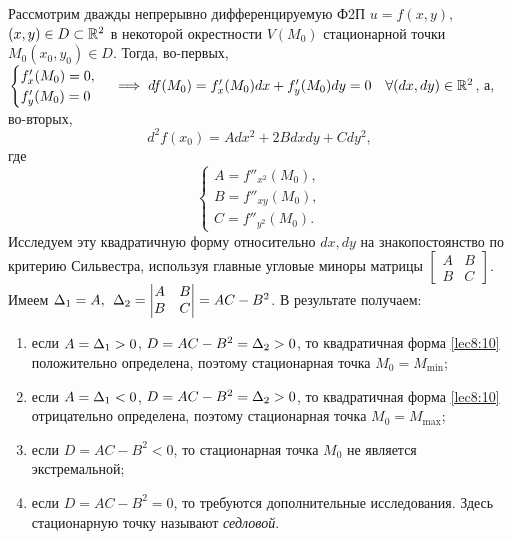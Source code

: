 \documentclass[../../main.tex]{subfiles}
\begin{document}
    \begin{iex}
        Рассмотрим дважды непрерывно дифференцируемую Ф2П $u = f(x, y), \;$
        $(x, y) \in D \subset \mathbb{R}^2$ в некоторой окрестности $V(M_0)$
        стационарной точки $M_0 (x_0, y_0) \in D$. Тогда, во-первых,
        $\begin{cases}
            f'_x(M_0) = 0, \\
            f'_y(M_0) = 0
        \end{cases}
        \implies df(M_0) = f'_x(M_0)dx + f'_y(M_0)dy = 0 
        \quad \forall(dx, dy)
        \in \mathbb{R}^2$, а, во-вторых,
        \begin{equation}
            d^2f(x_0) = Adx^2 + 2Bdxdy + Cdy^2,
            \label{lec8:10}
        \end{equation}
        где
        \[\begin{cases}
            A = f''_{x^2}(M_0), \\
            B = f''_{xy}(M_0), \\
            C = f''_{y^2}(M_0).
        \end{cases}\]
        Исследуем эту квадратичную форму относительно $dx, dy$ на
        знакопостоянство по критерию Сильвестра, используя главные угловые
        миноры матрицы
        $\begin{bmatrix}
            A & B \\
            B & C
        \end{bmatrix}$.
        Имеем $\Delta_1 = A,\:\: \Delta_2 =
        \begin{vmatrix}
            A & B \\
            B & C
        \end{vmatrix}
        = AC - B^2$. В результате получаем:
        \begin{enumerate}[label=\arabic*)]
            \item если $A = \Delta_1 > 0$, $D = AC-B^2 = \Delta_2 > 0$, то
            квадратичная форма \eqref{lec8:10} положительно определена,
            поэтому стационарная точка $M_0 = M_{\min}$;
            \item если $A = \Delta_1 < 0$, $D = AC-B^2 = \Delta_2 > 0$, то
            квадратичная форма \eqref{lec8:10} отрицательно определена,
            поэтому стационарная точка $M_0 = M_{\max}$;
            \item если $D = AC - B^2 < 0$, то стационарная точка $M_0$ не
            является экстремальной;
            \item если $D = AC - B^2 = 0$, то требуются дополнительные
            исследования. Здесь стационарную точку называют \emph{седловой}.
        \end{enumerate}
    \end{iex}
\end{document}
